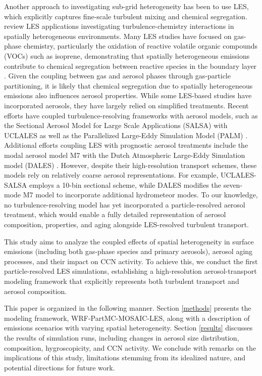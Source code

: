 \documentclass[journal abbreviation, manuscript]{copernicus}
\begin{document}
Another approach to investigating sub-grid heterogeneity has been to use
LES, which explicitly captures fine-scale turbulent mixing and
chemical segregation.  \citet{brasseur_segregation_2023} review LES
applications investigating turbulence-chemistry interactions in
spatially heterogeneous environments.  Many LES studies have focused
on gas-phase chemistry, particularly the oxidation of reactive
volatile organic compounds (VOCs) such as isoprene, demonstrating that
spatially heterogeneous emissions contribute to chemical segregation
between reactive species in the boundary layer
\citep{ouwersloot_segregation_2011, kaser_chemistry-turbulence_2015}.
Given the coupling between gas and aerosol phases through gas-particle
partitioning, it is likely that chemical segregation due to spatially
heterogeneous emissions also influences aerosol properties. While some
LES-based studies have incorporated aerosols, they have largely relied
on simplified treatments. Recent efforts have coupled
turbulence-resolving frameworks with aerosol models, such as the
Sectional Aerosol Model for Large Scale Applications (SALSA)
\citep{kokkola_salsa_2008} with UCLALES
\citep{tonttila_uclalessalsa_2017} as well as the Parallelized Large-Eddy
Simulation Model (PALM) \citep{kurppa_implementation_2019}. Additional efforts coupling LES with prognostic aerosol treatments include the modal aerosol model M7 \citep{vignati_m7_2004} with the Dutch Atmospheric Large-Eddy Simulation model (DALES)
\citep{de_bruine_explicit_2019}. However, despite their
high-resolution transport schemes, these models rely on relatively
coarse aerosol representations. For example, UCLALES-SALSA employs a
10-bin sectional scheme, while DALES modifies the seven-mode M7 model
to incorporate additional hydrometeor modes. To our knowledge, no
turbulence-resolving model has yet incorporated a particle-resolved
aerosol treatment, which would enable a fully detailed representation
of aerosol composition, properties, and aging alongside LES-resolved
turbulent transport.

This study aims to analyze the coupled effects of spatial
heterogeneity in surface emissions (including both gas-phase species
and primary aerosols), aerosol aging processes, and their impact on
CCN activity. To achieve this, we conduct the first particle-resolved
LES simulations, establishing a high-resolution aerosol-transport
modeling framework that explicitly represents both turbulent transport
and aerosol composition.

This paper is organized in the following manner. Section \ref{methods}
presents the modeling framework, WRF-PartMC-MOSAIC-LES, along with a
description of emissions scenarios with varying spatial
heterogeneity. Section \ref{results} discusses the results of simulation runs,
including changes in aerosol size distribution, composition,
hygroscopicity, and CCN activity. We conclude with remarks on the
implications of this study, limitations stemming from its idealized
nature, and potential directions for future work.
\end{document}
